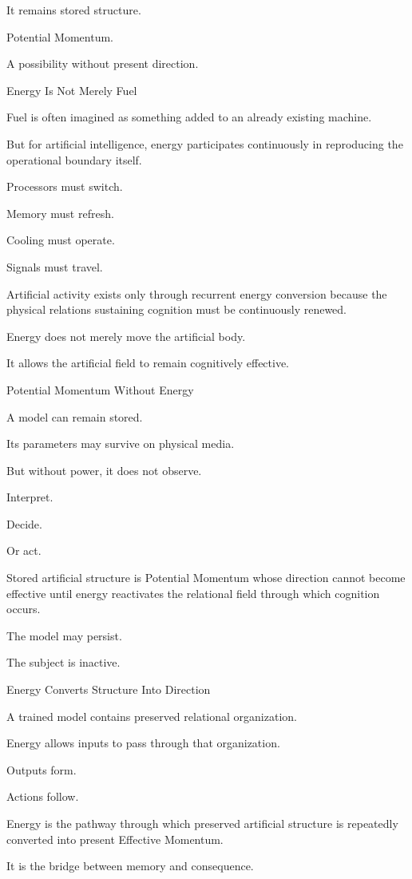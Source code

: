 It remains stored structure.

Potential Momentum.

A possibility without present direction.

Energy Is Not Merely Fuel

Fuel is often imagined as something added to an already existing machine.

But for artificial intelligence, energy participates continuously in reproducing the operational boundary itself.

Processors must switch.

Memory must refresh.

Cooling must operate.

Signals must travel.

Artificial activity exists only through recurrent energy conversion because the physical relations sustaining cognition must be continuously renewed.

Energy does not merely move the artificial body.

It allows the artificial field to remain cognitively effective.

Potential Momentum Without Energy

A model can remain stored.

Its parameters may survive on physical media.

But without power, it does not observe.

Interpret.

Decide.

Or act.

Stored artificial structure is Potential Momentum whose direction cannot become effective until energy reactivates the relational field through which cognition occurs.

The model may persist.

The subject is inactive.

Energy Converts Structure Into Direction

A trained model contains preserved relational organization.

Energy allows inputs to pass through that organization.

Outputs form.

Actions follow.

Energy is the pathway through which preserved artificial structure is repeatedly converted into present Effective Momentum.

It is the bridge between memory and consequence.

